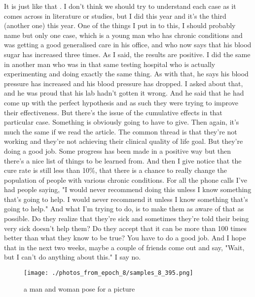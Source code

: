 \documentclass{article}%
\begin{document}
It is just like that . I don't think we should try to understand each case as it comes across in literature or studies, but I did this year and it's the third (another one) this year. One of the things I put in to this, I should probably name but only one case, which is a young man who has chronic conditions and was getting a good generalised care in his office, and who now says that his blood sugar has increased three times. As I said, the results are positive. I did the same in another man who was in that same testing hospital who is actually experimenting and doing exactly the same thing. As with that, he says his blood pressure has increased and his blood pressure has dropped. I asked about that, and he was proud that his lab hadn't gotten it wrong. And he said that he had come up with the perfect hypothesis and as such they were trying to improve their effectiveness. But there's the issue of the cumulative effects in that particular case. Something is obviously going to have to give. Then again, it's much the same if we read the article. The common thread is that they're not working and they're not achieving their clinical quality of life goal. But they're doing a good job. Some progress has been made in a positive way but then there's a nice list of things to be learned from. And then I give notice that the cure rate is still less than 10\%, that there is a chance to really change the population of people with various chronic conditions.\newline%
For all the phone calls I've had people saying, "I would never recommend doing this unless I know something that's going to help. I would never recommend it unless I know something that's going to help." And what I'm trying to do, is to make them as aware of that as possible. Do they realize that they're sick and sometimes they're told their being very sick doesn't help them? Do they accept that it can be more than 100 times better than what they know to be true? You have to do a good job. And I hope that in the next two weeks, maybe a couple of friends come out and say, "Wait, but I can't do anything about this." I say no.\newline%

%


\begin{figure}[h!]%
\centering%
\texttt{[image: ./photos\_from\_epoch\_8/samples\_8\_395.png]}%
\caption{a man and woman pose for a picture}%
\end{figure}

%
\end{document}
